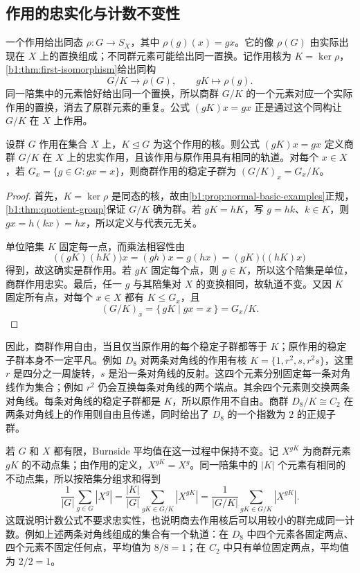 \subsection{作用的忠实化与计数不变性}
\label{b1:subsec:0403:03}

一个作用给出同态 \(\rho:G\rightarrow S_X\)，其中 \(\rho(g)(x)=gx\)。它的像 \(\rho(G)\) 由实际出现在 \(X\) 上的置换组成；不同群元素可能给出同一置换。记作用核为 \(K=\ker\rho\)，\cref{b1:thm:first-isomorphism}给出同构
\[
	G/K\longrightarrow\rho(G),\qquad gK\longmapsto\rho(g).
\]
同一陪集中的元素恰好给出同一个置换，所以商群 \(G/K\) 的一个元素对应一个实际作用的置换，消去了原群元素的重复。公式 \((gK)x=gx\) 正是通过这个同构让 \(G/K\) 在 \(X\) 上作用。

\begin{proposition}\label{b1:prop:quotient-action}
	设群 \(G\) 作用在集合 \(X\) 上，\(K\trianglelefteq G\) 为这个作用的核。则公式 \((gK)x=gx\) 定义商群 \(G/K\) 在 \(X\) 上的忠实作用，且该作用与原作用具有相同的轨道。对每个 \(x\in X\)，若 \(G_x=\{g\in G:gx=x\}\)，则商群作用的稳定子群为 \((G/K)_x=G_x/K\)。
\end{proposition}
\begin{proof}
	首先，\(K=\ker\rho\) 是同态的核，故由\cref{b1:prop:normal-basic-examples}正规，\cref{b1:thm:quotient-group}保证 \(G/K\) 确为群。若 \(gK=hK\)，写 \(g=hk\)、\(k\in K\)，则 \(gx=h(kx)=hx\)，所以定义与代表元无关。

	单位陪集 \(K\) 固定每一点，而乘法相容性由
	\[
		\bigl((gK)(hK)\bigr)x=(gh)x=g(hx)=(gK)\bigl((hK)x\bigr)
	\]
	得到，故这确实是群作用。若 \(gK\) 固定每个点，则 \(g\in K\)，所以这个陪集是单位，商群作用忠实。最后，任一 \(g\) 与其陪集对 \(X\) 的变换相同，故轨道不变。又因 \(K\) 固定所有点，对每个 \(x\in X\) 都有 \(K\leq G_x\)，且
	\[
		(G/K)_x=\{\,gK\mid gx=x\,\}=G_x/K.
	\]
\end{proof}

因此，商群作用自由，当且仅当原作用的每个稳定子群都等于 \(K\)；原作用的稳定子群本身不一定平凡。例如 \(D_8\) 对两条对角线的作用有核 \(K=\{1,r^2,s,r^2s\}\)，这里 \(r\) 是四分之一周旋转，\(s\) 是沿一条对角线的反射。这四个元素分别固定每一条对角线作为集合；例如 \(r^2\) 仍会互换每条对角线的两个端点。其余四个元素则交换两条对角线。每条对角线的稳定子群都是 \(K\)，所以原作用不自由。商群 \(D_8/K\cong C_2\) 在两条对角线上的作用则自由且传递，同时给出了 \(D_8\) 的一个指数为 \(2\) 的正规子群。

\ProseParagraphBreak
若 \(G\) 和 \(X\) 都有限，Burnside 平均值在这一过程中保持不变。记 \(X^{gK}\) 为商群元素 \(gK\) 的不动点集；由作用的定义，\(X^{gK}=X^g\)。同一陪集中的 \(|K|\) 个元素有相同的不动点集，所以按陪集分组求和得到
\[
	\frac{1}{|G|}\sum_{g\in G}|X^g| =\frac{|K|}{|G|}\sum_{gK\in G/K}|X^{gK}| =\frac{1}{|G/K|}\sum_{gK\in G/K}|X^{gK}|.
\]
这既说明计数公式不要求忠实性，也说明商去作用核后可以用较小的群完成同一计数。例如上述两条对角线组成的集合有一个轨道：在 \(D_8\) 中四个元素各固定两点、四个元素不固定任何点，平均值为 \(8/8=1\)；在 \(C_2\) 中只有单位固定两点，平均值为 \(2/2=1\)。
